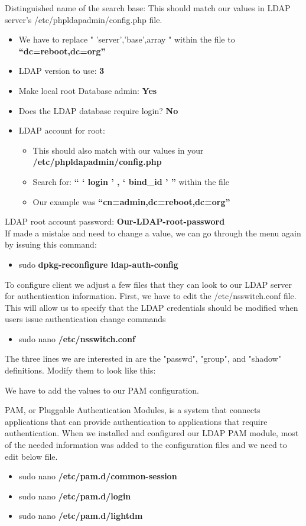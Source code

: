 \documentclass[12pt]{report}
\begin{document}
		Distinguished name of the search base:
		This should match our values in LDAP server's /etc/phpldapadmin/config.php file.
		\begin{itemize}
		\item We have to replace " 'server','base',array " within the file to \textbf{``dc=reboot,dc=org''}
		\item LDAP version to use:\textbf{ 3}
		\item Make local root Database admin: \textbf{Yes}
		\item Does the LDAP database require login? \textbf{No}
	 	\item LDAP account for root:
		 	\begin{itemize}
	 		\item This should also match with our values in your \textbf{/etc/phpldapadmin/config.php}
			\item Search for: \textbf{`` ` login ' , ` bind\_id ' '' } within the file
			\item Our example was \textbf{``cn=admin,dc=reboot,dc=org''}
		 	\end{itemize}
		\end{itemize}
		LDAP root account password: \textbf{Our-LDAP-root-password}
		\\
		\linebreak
		If made a mistake and need to change a value, we can go through the menu again by issuing this command:
		\begin{itemize}
		\item sudo \textbf{dpkg-reconfigure ldap-auth-config}
		\end{itemize}
		
		To configure client we adjust a few files that they can look to our LDAP server for authentication information.
		First, we have to edit the /etc/nsswitch.conf file. This will allow us to specify that the LDAP credentials should be modified when users issue authentication change commands
		\begin{itemize}
		\item sudo nano \textbf{/etc/nsswitch.conf}
		\end{itemize}
		\pagebreak
		The three lines we are interested in are the "passwd", "group", and "shadow" definitions. 
		Modify them to look like this:
		
		
		We have to add the values to our PAM configuration.
		
		PAM, or Pluggable Authentication Modules, is a system that connects applications that can provide authentication to applications that require authentication.
		When we installed and configured our LDAP PAM module, most of the needed information was added to the configuration files and we need to edit below file.
		\begin{itemize}
		\item sudo nano \textbf{/etc/pam.d/common-session}
		\item sudo nano \textbf{/etc/pam.d/login}
		\item sudo nano \textbf{/etc/pam.d/lightdm}
		\end{itemize}
		
\end{document}
